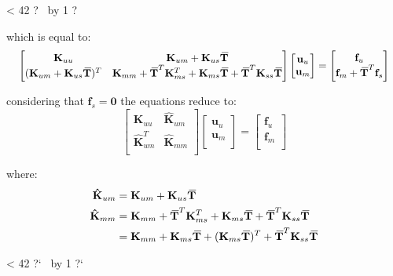 \documentclass[10pt,b5paper,titlepage]{book}
\newcommand{\m}{\mathbf}
\newcommand{\closure}[2][3]{%
{}\mkern#1mu\overline{\mkern-#1mu#2}}
\newcommand{\repeatit}[3][10]{%
    \myloopcounter1%
    \loop\ifnum\myloopcounter < #1
    #2#3%
    \advance\myloopcounter by 1%
    \repeat%
    #2%
}
\newenvironment{qbox}
{
\begin{center}
    \repeatit[42]{?}{\ }
\end{center}
}
{
\begin{center}
    \repeatit[42]{?`}{\ }
\end{center}
}
\newenvironment{eqarray}
{
    \begin{eqnarray}
        \begin{aligned}
}
{
        \end{aligned}
    \end{eqnarray}
}
\begin{document}
\begin{qbox}
    which is equal to:
    \begin{equation}
        \scalebox{0.95}{
        $ \begin{bmatrix}
            \m{K}_{uu} & \m{K}_{um} + \m{K}_{us} \m{\closure{T}} \\
            (\m{K}_{um} + \m{K}_{us} \m{\closure{T}})^T &
            \m{K}_{mm} + \m{\closure{T}}^T \m{K}_{ms}^T +
            \m{K}_{ms} \m{\closure{T}} + \m{\closure{T}}^T \m{K}_{ss} \m{\closure{T}} \\
        \end{bmatrix}
        \begin{bmatrix}
            \m{u}_u \\
            \m{u}_m \\
        \end{bmatrix}
        = \begin{bmatrix}
            \m{f}_u \\
            \m{f}_m + \m{\closure{T}}^T \m{f}_s \\
        \end{bmatrix} $
        }
    \end{equation}

    considering that $ \m{f}_s = \m{0} $ the equations reduce to:
    \begin{equation}
        \begin{bmatrix}
            \m{K}_{uu} & \m{\hat{K}}_{um} \\
            \m{\hat{K}}_{um}^T & \m{\hat{K}}_{mm} \\
        \end{bmatrix}
        \begin{bmatrix}
            \m{u}_u \\
            \m{u}_m \\
        \end{bmatrix}
        = \begin{bmatrix}
            \m{f}_u \\
            \m{f}_m \\
        \end{bmatrix}
    \end{equation}

    where:
    \begin{eqarray}
        \m{\hat{K}}_{um} &= \m{K}_{um} + \m{K}_{us} \m{\closure{T}} \\
        \m{\hat{K}}_{mm} &= \m{K}_{mm} + \m{\closure{T}}^T \m{K}_{ms}^T
                          + \m{K}_{ms} \m{\closure{T}}
                          + \m{\closure{T}}^T \m{K}_{ss} \m{\closure{T}} \\
                         &= \m{K}_{mm} + \m{K}_{ms} \m{\closure{T}}
                          + (\m{K}_{ms} \m{\closure{T}})^T
                          + \m{\closure{T}}^T \m{K}_{ss} \m{\closure{T}}
    \end{eqarray}

\end{qbox}
\end{document}
